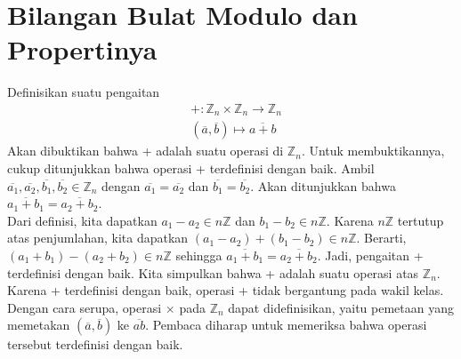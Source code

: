 	\section{Bilangan Bulat Modulo dan Propertinya}
	Definisikan suatu pengaitan
	\begin{equation*}
	\begin{split}
		& +: \mathbb{Z}_n \times \mathbb{Z}_n \rightarrow \mathbb{Z}_n\\
		& (\overline{a}, \overline{b}) \mapsto \overline{a+b}
	\end{split}
	\end{equation*}
	Akan dibuktikan bahwa + adalah suatu operasi di $\mathbb{Z}_n$. Untuk membuktikannya, cukup ditunjukkan bahwa operasi + terdefinisi dengan baik.
	Ambil $\overline{a_1},\overline{a_2},\overline{b_1},\overline{b_2} \in \mathbb{Z}_n$ dengan $\overline{a_1} = \overline{a_2}$ dan $\overline{b_1} = \overline{b_2}$. Akan ditunjukkan bahwa $\overline{a_1 + b_1} = \overline{a_2 + b_2}$.
	\\
	
	Dari definisi, kita dapatkan $a_1 - a_2 \in n\mathbb{Z}$ dan $b_1 - b_2 \in n\mathbb{Z}$. Karena $n\mathbb{Z}$ tertutup atas penjumlahan, kita dapatkan $(a_1 - a_2) + (b_1 - b_2) \in n\mathbb{Z}$. Berarti, $(a_1 + b_1) - (a_2 + b_2) \in n\mathbb{Z}$ sehingga $\overline{a_1 + b_1} = \overline{a_2 + b_2}$. Jadi, pengaitan + terdefinisi dengan baik. Kita simpulkan bahwa + adalah suatu operasi atas $\mathbb{Z}_n$. Karena + terdefinisi dengan baik, operasi + tidak bergantung pada wakil kelas.
	\\
	
	Dengan cara serupa, operasi $\times$ pada $\mathbb{Z}_n$ dapat didefinisikan, yaitu pemetaan yang memetakan $(\overline{a}, \overline{b})$ ke $\overline{ab}$. Pembaca diharap untuk memeriksa bahwa operasi tersebut terdefinisi dengan baik.
	\\
	
